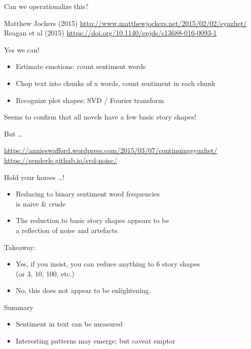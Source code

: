 \documentclass[aspectratio=169,usenames,dvipsnames]{beamer}
\begin{document}
\begin{frame}{Can we operationalize this?}
    \begin{reference}
        Matthew Jockers (2015) \url{http://www.matthewjockers.net/2015/02/02/syuzhet/}
        Reagan et al (2015) \url{https://doi.org/10.1140/epjds/s13688-016-0093-1}
    \end{reference}
    Yes we can!
    \begin{itemize}
        \item Estimate emotions: count sentiment words
        \item Chop text into chunks of x words, count sentiment in each chunk
        \item Recognize plot shapes: SVD / Fourier transform
    \end{itemize}
    Seems to confirm that all novels have a few basic story shapes!
\end{frame}

\begin{frame}{But \dots}
    \begin{reference}
        \url{https://annieswafford.wordpress.com/2015/03/07/continuingsyuzhet/} \\
        \url{https://senderle.github.io/svd-noise/}
    \end{reference}
    Hold your horses \dots !

    \begin{itemize}
        \item Reducing  to binary sentiment word frequencies \\
            is naive \& crude
        \item The reduction to basic story shapes appears to be \\
            a reflection of noise and artefacts.
    \end{itemize}

    \pause
    Takeaway:
    \begin{itemize}
        \item Yes, if you insist, you can reduce anything to 6 story shapes \\
            (or 3, 10, 100, etc.)
        \item No, this does not appear to be enlightening.
    \end{itemize}
\end{frame}

\begin{frame}{Summary}
    \begin{itemize}
        \item Sentiment in text can be measured
        \item Interesting patterns may emerge; but caveat emptor
    \end{itemize}
\end{frame}
\end{document}
